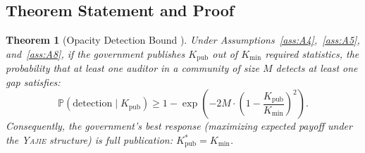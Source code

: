 \documentclass[11pt,a4paper]{article}
\newtheorem{theorem}{Theorem}[section]
\theoremstyle{definition}
\newcommand{\Yajie}{\textsc{Yajie}}
\newcommand{\Pbb}{\mathbb{P}}
\begin{document}
\subsection{Theorem Statement and Proof}
\begin{theorem}[Opacity Detection Bound ]
\label{thm:opacity}
Under Assumptions~\ref{ass:A4},~\ref{ass:A5}, and~\ref{ass:A8}, if the government publishes $K_{\mathrm{pub}}$ out of $K_{\min}$ required statistics, the probability that at least one auditor in a community of size $M$ detects at least one gap satisfies:
\begin{equation}
    \Pbb(\text{detection} \mid K_{\mathrm{pub}}) \geq 1 - \exp\left(-2M \cdot \left(1 - \frac{K_{\mathrm{pub}}}{K_{\min}}\right)^2\right).
    \label{eq:opacity_bound}
\end{equation}
Consequently, the government's best response (maximizing expected payoff under the \Yajie{} structure) is full publication: $K_{\mathrm{pub}}^* = K_{\min}$.
\end{theorem}
\end{document}
